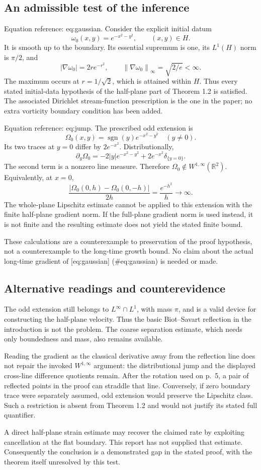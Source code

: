 \documentclass[10pt]{article}
\begin{document}
\subsection*{An admissible test of the inference}
Equation reference: eq:gaussian. Consider the explicit initial datum \[
 \omega_0(x,y)=e^{-x^2-y^2},\qquad (x,y)\in H .\] It is smooth up to the boundary. Its essential supremum is one, its \(L^1(H)\) norm is \(\pi/2\), and \[|\nabla\omega_0|=2r e^{-r^2},\qquad
 \left\lVert\nabla\omega_0\right\rVert_\infty=\sqrt{2/e}<\infty .\] The maximum occurs at \(r=1/\sqrt2\), which is attained within \(H\). Thus every stated initial-data hypothesis of the half-plane part of Theorem 1.2 is satisfied. The associated Dirichlet stream-function prescription is the one in the paper; no extra vorticity boundary condition has been added.\par
Equation reference: eq:jump. The prescribed odd extension is \[\Omega_0(x,y)=\operatorname{sgn}(y)e^{-x^2-y^2}\quad(y\ne0).\] Its two traces at \(y=0\) differ by \(2e^{-x^2}\). Distributionally, \[
 \partial_y\Omega_0
 =-2|y|e^{-x^2-y^2}
   +2e^{-x^2}\delta_{\{y=0\}} .\] The second term is a nonzero line measure. Therefore \(\Omega_0\notin W^{1,\infty}(\mathbb R^2)\). Equivalently, at \(x=0\), \[\frac{|\Omega_0(0,h)-\Omega_0(0,-h)|}{2h}
 =\frac{e^{-h^2}}h\longrightarrow\infty.\] The whole-plane Lipschitz estimate cannot be applied to this extension with the finite half-plane gradient norm. If the full-plane gradient norm is used instead, it is not finite and the resulting estimate does not yield the stated finite bound.\par
These calculations are a counterexample to preservation of the proof hypothesis, not a counterexample to the long-time growth bound. No claim about the actual long-time gradient of [eq:gaussian] (\#eq:gaussian) is needed or made.\par
\subsection*{Alternative readings and counterevidence}
The odd extension still belongs to \(L^\infty\cap L^1\), with mass \(\pi\), and is a valid device for constructing the half-plane velocity. Thus the basic Biot–Savart reflection in the introduction is not the problem. The coarse separation estimate, which needs only boundedness and mass, also remains available.\par
Reading the gradient as the classical derivative away from the reflection line does not repair the invoked \(W^{1,\infty}\) argument: the distributional jump and the displayed cross-line difference quotients remain. After the rotation used on p. 5, a pair of reflected points in the proof can straddle that line. Conversely, if zero boundary trace were separately assumed, odd extension would preserve the Lipschitz class. Such a restriction is absent from Theorem 1.2 and would not justify its stated full quantifier.\par
A direct half-plane strain estimate may recover the claimed rate by exploiting cancellation at the flat boundary. This report has not supplied that estimate. Consequently the conclusion is a demonstrated gap in the stated proof, with the theorem itself unresolved by this test.\par
\end{document}
